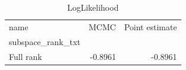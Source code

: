 \begin{table}[H]
\caption{LogLikelihood}
\begin{tabular}{lrr}
\toprule
name & MCMC & Point estimate \\
subspace_rank_txt &  &  \\
\midrule
Full rank & -0.8961 & -0.8961 \\
\bottomrule
\end{tabular}
\end{table}
